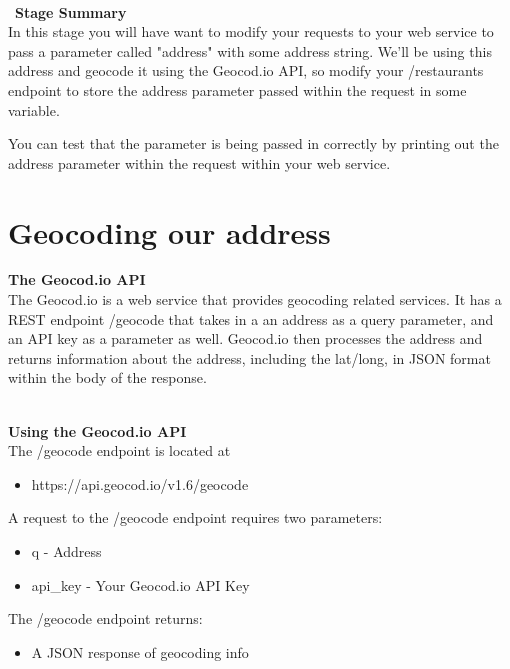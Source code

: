 \documentclass{article}
\begin{document}
\-\\\ 
\textbf{Stage Summary}\\
In this stage you will have want to modify your requests to your web service to pass a parameter called "address" with some address string. We'll be using this address and geocode it using the Geocod.io API, so modify your /restaurants endpoint to store the address parameter passed within the request in some variable. 

\begin{info}[Hint:]
You can test that the parameter is being passed in correctly by printing out the address parameter within the request within your web service. 
\end{info}


\section{Geocoding our address}

\textbf{The Geocod.io API}\\
The Geocod.io is a web service that provides geocoding related services. It has a REST endpoint /geocode that takes in a an address as a query parameter, and an API key as a parameter as well. Geocod.io then processes the address and returns information about the address, including the lat/long, in JSON format within the body of the response. 

\-\ \\
\textbf{Using the Geocod.io API}\\
The /geocode endpoint is located at
\begin{itemize}
\item https://api.geocod.io/v1.6/geocode
\end{itemize}
A request to the /geocode endpoint requires two parameters:
\begin{itemize}
\item q - Address
\item api\_key - Your Geocod.io API Key
\end{itemize}
The /geocode endpoint returns:
\begin{itemize}
\item A JSON response of geocoding info
\end{itemize}
\end{document}
